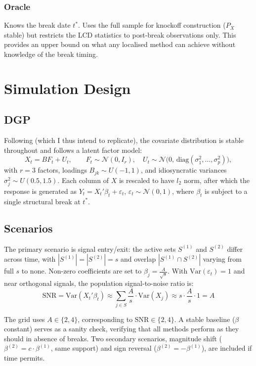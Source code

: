 \documentclass[12pt, a4paper]{article}
\begin{document}
\subsubsection{Oracle}
 
Knows the break date $t^*$. Uses the full sample for knockoff construction ($P_X$ stable) but restricts the LCD statistics to post-break observations only. This provides an upper bound on what any localised method can achieve without knowledge of the break timing.

\section{Simulation Design}
\subsection{DGP}
Following \citet{fan2020ipad} (which I thus intend to replicate), the covariate distribution is stable throughout and follows a latent factor model:
\begin{equation}
    X_t = BF_t + U_t, \qquad F_t \sim \mathcal{N}(0, I_r), \quad U_t \sim \mathcal{N}\!\bigl(0,\, \text{diag}(\sigma_1^2, \ldots, \sigma_p^2)\bigr),
\end{equation}
with $r = 3$ factors, loadings $B_{jk} \sim U(-1,1)$, and idiosyncratic variances $\sigma_j^2 \sim U(0.5, 1.5)$. Each column of $X$ is rescaled to have $\textit{l}_2$ norm, after which the response is generated as $Y_t = X_t'\beta_t + \varepsilon_t$, $\varepsilon_t \sim \mathcal{N}(0,1)$, where $\beta_t$ is subject to a single structural break at $t^*$.

\subsection{Scenarios}
 
The primary scenario is signal entry/exit: the active sets $S^{(1)}$ and $S^{(2)}$ differ across time, with $|S^{(1)}| = |S^{(2)}| = s$ and overlap $|S^{(1)} \cap S^{(2)}|$ varying from full $s$ to none. Non-zero coefficients are set to $\beta_j = \frac{A}{\sqrt{s}}$. With $\text{Var}(\varepsilon_t) = 1$ and near orthogonal signals, the population signal-to-noise ratio is:
$$\text{SNR} = \text{Var}(X_t' \beta_t) \approx \sum_{j \in S} \frac{A}{s} \cdot \text{Var}(X_j) \approx s \cdot \frac{A}{s} \cdot 1 = A$$

The grid uses $A \in \{2, 4\}$, corresponding to $\text{SNR} \in \{2, 4\}$. A stable baseline ($\beta$ constant) serves as a sanity check, verifying that all methods perform as they should in absence of breaks. Two secondary scenarios, magnitude shift ($\beta^{(2)} = c \cdot \beta^{(1)}$, same support) and sign reversal ($\beta^{(2)} = -\beta^{(1)}$), are included if time permits.
\end{document}
